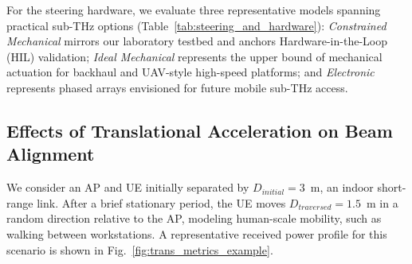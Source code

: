 \documentclass[fleqn,10pt]{wlscirep}
\newcommand{\rev}[1]{{\color{revblue}#1}}
\begin{document}
\rev{For the steering hardware, we evaluate three representative models spanning practical sub-THz options (Table~\ref{tab:steering_and_hardware}): \textit{Constrained Mechanical} mirrors our laboratory testbed and anchors Hardware-in-the-Loop (HIL) validation; \textit{Ideal Mechanical} represents the upper bound of mechanical actuation for backhaul and UAV-style high-speed platforms; and \textit{Electronic} represents phased arrays envisioned for future mobile sub-THz access.}



\subsection*{Effects of Translational Acceleration on Beam Alignment}

We consider an AP and UE initially separated by $D_{initial} = 3$~m, an indoor short-range link\cite{9013236}. After a brief stationary period, the UE moves $D_{traversed} = 1.5$~m in a random direction relative to the AP, modeling human-scale mobility, such as walking between workstations. A representative received power profile for this scenario is shown in Fig.~\ref{fig:trans_metrics_example}.
\end{document}
